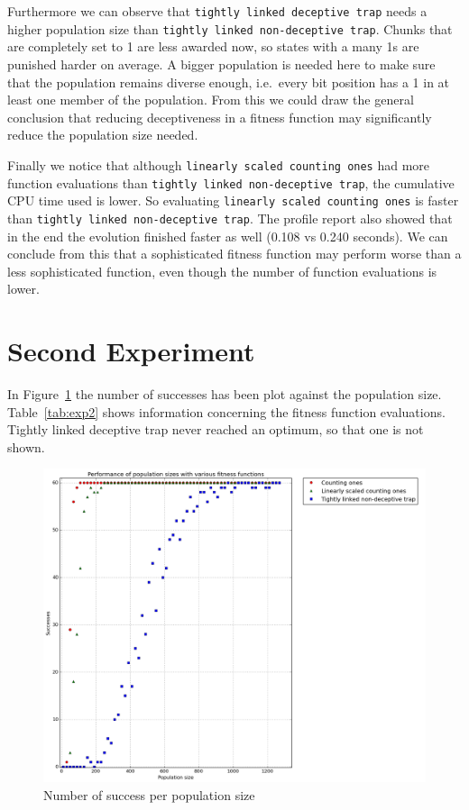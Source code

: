\documentclass[12pt]{article}
\theoremstyle{definition}
\newcommand{\lsco}{\texttt{linearly scaled counting ones}}
\newcommand{\tdt}{\texttt{tightly linked deceptive trap}}
\newcommand{\tnt}{\texttt{tightly linked non-deceptive trap}}
\begin{document}
Furthermore we can observe that \tdt{} needs a higher population size than \tnt{}.
Chunks that are completely set to 1 are less awarded now,
so states with a many 1s are punished harder on average.
A bigger population is needed here to make sure that the population remains diverse enough,
i.e.\ every bit position has a 1 in at least one member of the population.
From this we could draw the general conclusion that reducing deceptiveness in a fitness function
may significantly reduce the population size needed.

Finally we notice that although \lsco{} had more function evaluations than \tnt{},
the cumulative CPU time used is lower.
So evaluating \lsco{} is faster than \tnt{}.
The profile report also showed that in the end the evolution finished faster as well
(0.108 vs 0.240 seconds).
We can conclude from this that a sophisticated fitness function may perform worse than
a less sophisticated function, even though the number of function evaluations is lower.



\section{Second Experiment}
\label{ssec:exp2}
In Figure~\ref{fig:exp2} the number of successes has been plot against the population size.
Table~\ref{tab:exp2} shows information concerning the fitness function evaluations.
Tightly linked deceptive trap never reached an optimum, so that one is not shown.

\begin{figure}[!htb]
    \centering
    \includegraphics[totalheight=0.7\textheight]{images/exp2.png}
    \caption{Number of success per population size}
\label{fig:exp2}
\end{figure}
\end{document}

